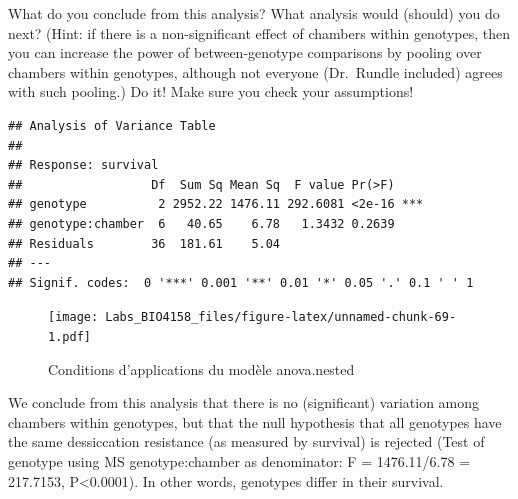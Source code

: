 \documentclass[
  12pt,
]{book}
\newenvironment{Shaded}{\begin{snugshade}}{\end{snugshade}}
\newcommand{\DataTypeTok}[1]{\textcolor[rgb]{0.13,0.29,0.53}{#1}}
\newcommand{\KeywordTok}[1]{\textcolor[rgb]{0.13,0.29,0.53}{\textbf{#1}}}
\newcommand{\NormalTok}[1]{#1}
\newcommand{\OperatorTok}[1]{\textcolor[rgb]{0.81,0.36,0.00}{\textbf{#1}}}
\newcommand{\StringTok}[1]{\textcolor[rgb]{0.31,0.60,0.02}{#1}}
\begin{document}
\begin{Shaded}
\end{Shaded}

What do you conclude from this analysis? What analysis would (should) you do next? (Hint: if there is a non-significant effect of chambers within genotypes, then you can increase the power of between-genotype comparisons by pooling over chambers within genotypes, although not everyone (Dr.~Rundle included) agrees with such pooling.) Do it! Make sure you check your assumptions!

\begin{verbatim}
## Analysis of Variance Table
## 
## Response: survival
##                  Df  Sum Sq Mean Sq  F value Pr(>F)    
## genotype          2 2952.22 1476.11 292.6081 <2e-16 ***
## genotype:chamber  6   40.65    6.78   1.3432 0.2639    
## Residuals        36  181.61    5.04                    
## ---
## Signif. codes:  0 '***' 0.001 '**' 0.01 '*' 0.05 '.' 0.1 ' ' 1
\end{verbatim}

\begin{figure}
\centering
\texttt{[image: Labs\_BIO4158\_files/figure-latex/unnamed-chunk-69-1.pdf]}
\caption{\label{fig:unnamed-chunk-69}Conditions d'applications du modèle anova.nested}
\end{figure}

We conclude from this analysis that there is no (significant) variation among chambers within genotypes, but that the null hypothesis that all genotypes have the same dessiccation resistance (as measured by survival) is rejected (Test of genotype using MS genotype:chamber as denominator: F = 1476.11/6.78 = 217.7153, P\textless0.0001). In other words, genotypes differ in their survival.
\end{document}
